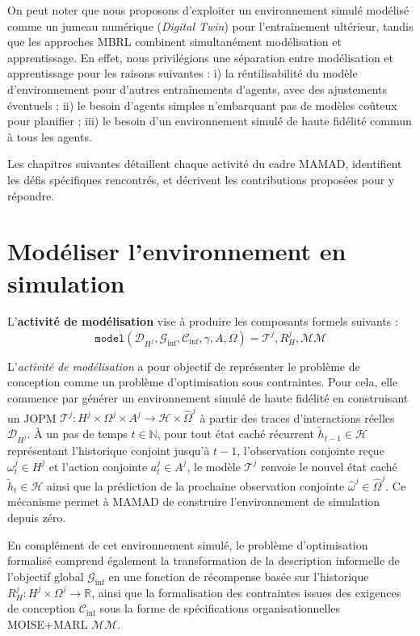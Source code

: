 \noindent On peut noter que nous proposons d'exploiter un environnement simulé modélisé comme un jumeau numérique (\textit{Digital Twin}) pour l'entraînement ultérieur, tandis que les approches \ac{MBRL} combinent simultanément modélisation et apprentissage. En effet, nous privilégions une séparation entre modélisation et apprentissage pour les raisons suivantes : i) la réutilisabilité du modèle d'environnement pour d'autres entraînements d'agents, avec des ajustements éventuels ; \quad ii) le besoin d'agents simples n'embarquant pas de modèles coûteux pour planifier ; \quad iii) le besoin d'un environnement simulé de haute fidélité commun à tous les agents.

\noindent Les chapitres suivantes détaillent chaque activité du cadre \ac{MAMAD}, identifient les défis spécifiques rencontrés, et décrivent les contributions proposées pour y répondre.


\chapter{Modéliser l'environnement en simulation}
\label{chap:modelling}

L'\textbf{activité de modélisation} vise à produire les composants formels suivants :
\begin{displaymath}
    \texttt{model}(\mathcal{D}_{H^j}, \mathcal{G}_{\text{inf}}, \mathcal{C}_{\text{inf}}, \gamma, A, \Omega) = \mathcal{T}^j, R^j_H, \mathcal{MM}
\end{displaymath}

\noindent L'\textit{activité de modélisation} a pour objectif de représenter le problème de conception comme un problème d'optimisation sous contraintes. Pour cela, elle commence par générer un environnement simulé de haute fidélité en construisant un \ac{JOPM} $\mathcal{T}^j : H^j \times \Omega^j \times A^j \rightarrow \mathcal{H} \times \hat{\Omega}^j$ à partir des traces d'interactions réelles $\mathcal{D}_{H^j}$. À un pas de temps $t \in \mathbb{N}$, pour tout état caché récurrent $\tilde{h}_{t-1} \in \mathcal{H}$ représentant l'historique conjoint jusqu'à $t-1$, l'observation conjointe reçue $\omega_t^j \in H^j$ et l'action conjointe $a_t^j \in A^j$, le modèle $\mathcal{T}^j$ renvoie le nouvel état caché $\tilde{h}_t \in \mathcal{H}$ ainsi que la prédiction de la prochaine observation conjointe $\hat{\omega}^j \in \hat{\Omega}^j$. Ce mécanisme permet à \ac{MAMAD} de construire l'environnement de simulation depuis zéro.

En complément de cet environnement simulé, le problème d'optimisation formalisé comprend également la transformation de la description informelle de l'objectif global $\mathcal{G}_{\text{inf}}$ en une fonction de récompense basée sur l'historique $R^j_H: H^j \times \Omega^j \rightarrow \mathbb{R}$, ainsi que la formalisation des contraintes issues des exigences de conception $\mathcal{C}_{\text{inf}}$ sous la forme de spécifications organisationnelles MOISE+MARL $\mathcal{MM}$.

